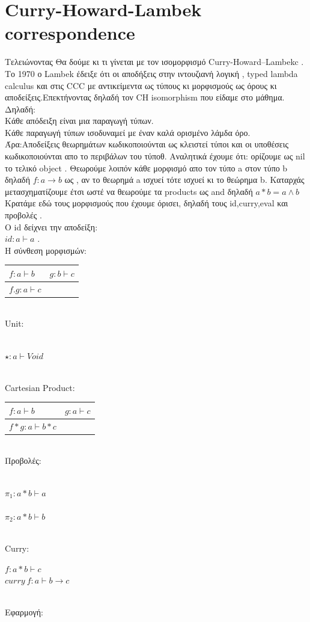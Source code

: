 \documentclass{article}
\begin{document}
\section*{Curry-Howard-Lambek correspondence}
Τελειώνοντας Θα δούμε κι τι γίνεται με τον ισομορφισμό Curry-Howard–Lambekc . 
Το 1970 ο Lambek έδειξε ότι οι αποδήξεις στην ιντουζιανή λογική , typed lambda calculus και στις CCC με αντικείμεντα ως τύπους κι μορφισμούς ως όρους κι αποδείξεις.Επεκτήνοντας δηλαδή τον CH isomorphism που είδαμε στο μάθημα.
\\
Δηλαδή:\\ Κάθε απόδειξη είναι μια παραγωγή τύπων. \\
Κάθε παραγωγή τύπων ισοδυναμεί με έναν καλά ορισμένο λάμδα όρο.\\
Άρα:Αποδείξεις θεωρημάτων κωδικοποιούνται ως κλειστεί τύποι και οι υποθέσεις κωδικοποιούνται απο το περιβάλων του τύποθ.
Αναλητικά έχουμε ότι:
ορίζουμε ως nil το τελικό object .
Θεωρούμε λοιπόν κάθε μορφισμό απο τον τύπο a στον τύπο b δηλαδή $f: a \rightarrow b$ ως , αν το θεωρημά a ισχυεί τότε ισχυεί κι το θεώρημα b.
Καταρχάς μετασχηματίζουμε έτσι ωστέ να θεωρούμε τα products ως and δηλαδή $a*b= a \land b$
Κρατάμε εδώ τους μορφισμούς που έχουμε όρισει, δηλαδή τους id,curry,eval και προβολές .
\\Ο id δείχνει την αποδείξη:\\ $id: a\vdash a$ . \\
Η σύνθεση μορφισμών:\\
\begin{tabular}{l  c}
	$f: a\vdash b$ & $g: b \vdash c$
\\	\hline
	$f.g : a \vdash c$
\end{tabular}
\\  Unit:\\
\begin{tabular}\\
 \hline
$ \star : a \vdash Void$\\
\end{tabular}
\\
Cartesian Product:\\
\begin{tabular} {l c}
	$f: a\vdash b$ & $g: a \vdash c$
\\	\hline
	$f*g : a \vdash b*c$\\
\end{tabular}
\\Προβολές:\\
\begin{tabular}
\\	\hline
	$\pi _1 : a*b \vdash a$
	\\
	
\\	\hline
	$\pi _2 : a*b \vdash b$ \\
\end{tabular}
\\Curry:\\
\begin{tabular}
	$f : a*b \vdash c$ 
\\	\hline
	$curry\ f : a \vdash b \rightarrow c$
\end{tabular}
\\Εφαρμογή:\\
\end{document}
